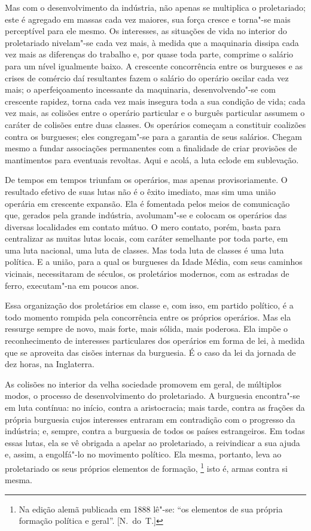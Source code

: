 Mas com o desenvolvimento da indústria, não apenas se multiplica o
proletariado; este é agregado em massas cada vez maiores, sua força
cresce e torna"-se mais perceptível para ele mesmo. Os interesses, as
situações de vida no interior do proletariado nivelam"-se cada vez
mais, à medida que a maquinaria dissipa cada vez mais as diferenças do
trabalho e, por quase toda parte, comprime o salário para um nível
igualmente baixo. A crescente concorrência entre os burgueses e as
crises de comércio daí resultantes fazem o salário do operário oscilar
cada vez mais; o aperfeiçoamento incessante da maquinaria,
desenvolvendo"-se com crescente rapidez, torna cada vez mais insegura
toda a sua condição de vida; cada vez mais, as colisões entre o
operário particular e o burguês particular assumem o caráter de
colisões entre duas classes. Os operários começam a constituir
coalizões contra os burgueses; eles congregam"-se para a garantia de
seus salários. Chegam mesmo a fundar associações permanentes com a
finalidade de criar provisões de mantimentos para eventuais revoltas.
Aqui e acolá, a luta eclode em sublevação.

De tempos em tempos triunfam os operários, mas apenas provisoriamente. O
resultado efetivo de suas lutas não é o êxito imediato, mas sim uma
união operária em crescente expansão. Ela é fomentada pelos meios de
comunicação que, gerados pela grande indústria, avolumam"-se e
colocam os operários das diversas localidades em contato mútuo. O mero
contato, porém, basta para centralizar as muitas lutas locais, com
caráter semelhante por toda parte, em uma luta nacional, uma luta de
classes. Mas toda luta de classes é uma luta política. E a união, para
a qual os burgueses da Idade Média, com seus caminhos vicinais,
necessitaram de séculos, os proletários modernos, com as estradas de
ferro, executam"-na em poucos anos.

Essa organização dos proletários em classe e, com isso, em partido
político, é a todo momento rompida pela concorrência entre os próprios
operários. Mas ela ressurge sempre de novo, mais forte, mais sólida,
mais poderosa. Ela impõe o reconhecimento de interesses particulares
dos operários em forma de lei, à medida que se aproveita das cisões
internas da burguesia. É o caso da lei da jornada de dez horas, na
Inglaterra.

As colisões no interior da velha sociedade promovem em geral, de
múltiplos modos, o processo de desenvolvimento do proletariado. A
burguesia encontra"-se em luta contínua: no início, contra a
aristocracia; mais tarde, contra as frações da própria burguesia cujos
interesses entraram em contradição com o progresso da indústria; e,
sempre, contra a burguesia de todos os países estrangeiros. Em todas
essas lutas, ela se vê obrigada a apelar ao proletariado, a reivindicar
a sua ajuda e, assim, a engolfá"-lo no movimento político. Ela mesma,
portanto, leva ao proletariado os seus próprios elementos de
formação, \footnote{ Na edição alemã publicada em 1888 lê"-se: ``os elementos	\EP[]
de sua própria formação política e geral''. [N.~do~T.]} isto é, armas contra 
si mesma.

